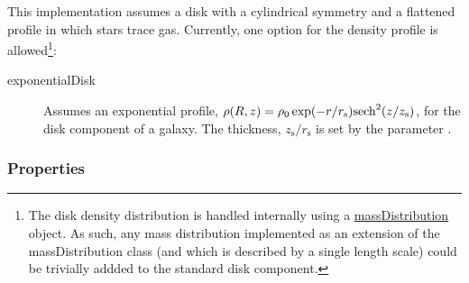 This implementation assumes a disk with a cylindrical symmetry and a flattened profile in which stars trace gas. Currently, one option for the density profile is allowed\footnote{The disk density distribution is handled internally using a \protect\href{https://github.com/galacticusorg/galacticus/releases/download/masterRelease/Galacticus_Development.pdf\#methods.massDistribution}{\normalfont \ttfamily massDistribution} object. As such, any mass distribution implemented as an extension of the {\normalfont \ttfamily massDistribution} class (and which is described by a single length scale) could be trivially addded to the standard disk component.}:
\begin{description}
\item [{\normalfont \ttfamily exponentialDisk}] Assumes an exponential profile, $\rho(R,z) = \rho_0 \exp(-r/r_\mathrm{s}) \hbox{sech}^2(z/z_\mathrm{s})$, for the disk \gls{component} of a galaxy. The thickness, $z_\mathrm{s}/r_\mathrm{s}$ is set by the parameter {\normalfont \ttfamily [heightToRadialScaleDisk]}.
\end{description}

\subsubsection{Properties}

